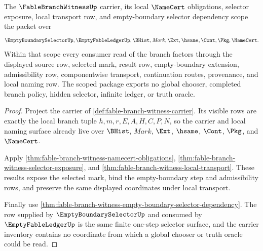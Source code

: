 \begin{theorem}
\label{thm:fable-branch-witness-scoped-dependency-package}
The $\FableBranchWitnessUp$ carrier, its local $\NameCert$ obligations, selector exposure, local transport row, and empty-boundary selector dependency scope the packet over
$$
\EmptyBoundarySelectorUp,\EmptyFableLedgerUp,\BHist,\mathit{Mark},\Ext,\hsame,\Cont,\Pkg,\NameCert.
$$
Within that scope every consumer read of the branch factors through the displayed source row, selected mark, result row, empty-boundary extension, admissibility row, componentwise transport, continuation routes, provenance, and local naming row. The scoped package exports no global chooser, completed branch policy, hidden selector, infinite ledger, or truth oracle.
\end{theorem}
\begin{proof}
Project the carrier of \autoref{def:fable-branch-witness-carrier}. Its visible rows are exactly the local branch tuple $h,m,r,E,A,H,C,P,N$, so the carrier and local naming surface already live over $\BHist$, $\mathit{Mark}$, $\Ext$, $\hsame$, $\Cont$, $\Pkg$, and $\NameCert$.

Apply \autoref{thm:fable-branch-witness-namecert-obligations}, \autoref{thm:fable-branch-witness-selector-exposure}, and \autoref{thm:fable-branch-witness-local-transport}. These results expose the selected mark, bind the empty-boundary step and admissibility rows, and preserve the same displayed coordinates under local transport.

Finally use \autoref{thm:fable-branch-witness-empty-boundary-selector-dependency}. The row supplied by $\EmptyBoundarySelectorUp$ and consumed by $\EmptyFableLedgerUp$ is the same finite one-step selector surface, and the carrier inventory contains no coordinate from which a global chooser or truth oracle could be read.
\end{proof}

